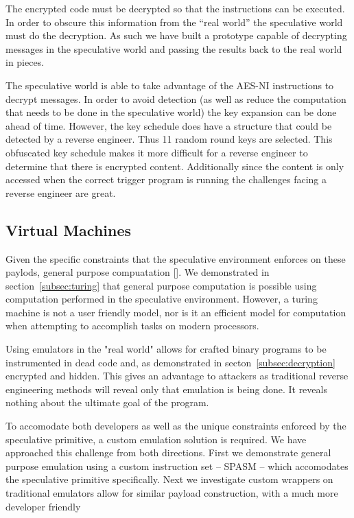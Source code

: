 The encrypted code must be decrypted so that the instructions can be executed.
In order to obscure this information from the ``real world'' the speculative
world must do the decryption. As such we have built a prototype capable of
decrypting messages in the speculative world and passing the results back to the
real world in pieces.

The speculative world is able to take advantage of the AES-NI instructions to
decrypt messages. In order to avoid detection (as well as reduce the computation
that needs to be done in the speculative world) the key expansion can be done
ahead of time. However, the key schedule does have a structure that could be
detected by a reverse engineer. Thus 11 random round keys are selected. This
obfuscated key schedule makes it more difficult for a reverse engineer to
determine that there is encrypted content. Additionally since the content is
only accessed when the correct trigger program is running the challenges facing
a reverse engineer are great.


% 
% 

\subsection{Virtual Machines}
Given the specific constraints that the speculative environment enforces on
these paylods, general purpose compuatation []. We demonstrated in
section~\ref{subsec:turing} that general purpose computation is possible using
computation performed in the speculative environment. However, a turing machine
is not a user friendly model, nor is it an efficient model for computation when
attempting to accomplish tasks on modern processors. 

Using emulators in the "real world" allows for crafted binary programs to be 
instrumented in dead code and, as demonstrated in secton~\ref{subsec:decryption} 
encrypted and hidden. This gives an advantage to attackers as traditional 
reverse engineering methods will reveal only that emulation is being done. 
It reveals nothing about the ultimate goal of the program. 

To accomodate both developers as well as the unique constraints 
enforced by the speculative primitive, a custom emulation solution is required. We 
have approached this challenge from both directions. First we demonstrate 
general purpose emulation using a custom instruction set -- SPASM -- which
accomodates the speculative primitive specifically. Next we investigate custom 
wrappers on traditional emulators allow for similar payload construction,
with a much more developer friendly 

%   

